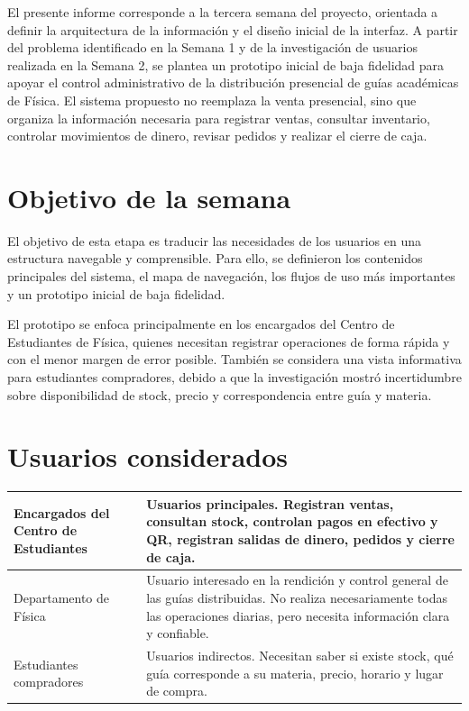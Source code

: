 ﻿\documentclass[12pt,letterpaper]{article}
\begin{document}
El presente informe corresponde a la tercera semana del proyecto, orientada a definir la arquitectura de la información y el diseño inicial de la interfaz. A partir del problema identificado en la Semana 1 y de la investigación de usuarios realizada en la Semana 2, se plantea un prototipo inicial de baja fidelidad para apoyar el control administrativo de la distribución presencial de guías académicas de Física. El sistema propuesto no reemplaza la venta presencial, sino que organiza la información necesaria para registrar ventas, consultar inventario, controlar movimientos de dinero, revisar pedidos y realizar el cierre de caja.

\section{Objetivo de la semana}

El objetivo de esta etapa es traducir las necesidades de los usuarios en una estructura navegable y comprensible. Para ello, se definieron los contenidos principales del sistema, el mapa de navegación, los flujos de uso más importantes y un prototipo inicial de baja fidelidad.

El prototipo se enfoca principalmente en los encargados del Centro de Estudiantes de Física, quienes necesitan registrar operaciones de forma rápida y con el menor margen de error posible. También se considera una vista informativa para estudiantes compradores, debido a que la investigación mostró incertidumbre sobre disponibilidad de stock, precio y correspondencia entre guía y materia.

\section{Usuarios considerados}

\begin{center}
\begin{tabularx}{\textwidth}{|B{4cm}|Y|}
\hline
Encargados del Centro de Estudiantes & Usuarios principales. Registran ventas, consultan stock, controlan pagos en efectivo y QR, registran salidas de dinero, pedidos y cierre de caja. \\
\hline
Departamento de Física & Usuario interesado en la rendición y control general de las guías distribuidas. No realiza necesariamente todas las operaciones diarias, pero necesita información clara y confiable. \\
\hline
Estudiantes compradores & Usuarios indirectos. Necesitan saber si existe stock, qué guía corresponde a su materia, precio, horario y lugar de compra. \\
\hline
\end{tabularx}
\end{center}
\end{document}
